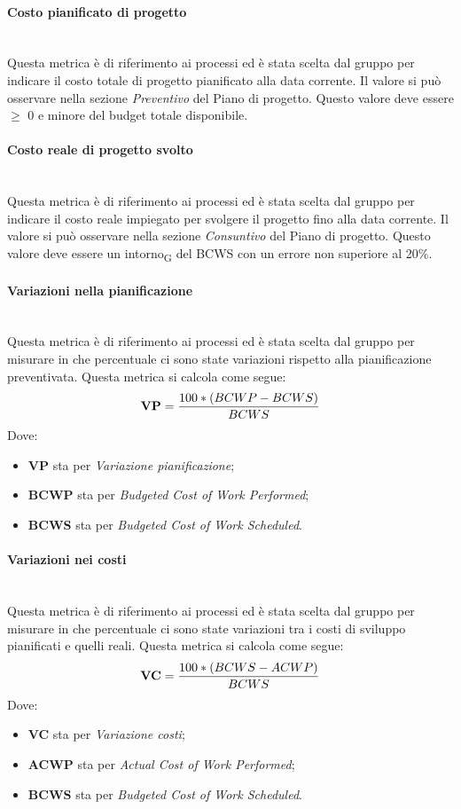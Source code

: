 \paragraph{Costo pianificato di progetto}\mbox{}\\
Questa metrica è di riferimento ai processi ed è stata scelta dal gruppo per indicare il costo totale di progetto pianificato alla data corrente. Il valore si può osservare nella sezione \textit{Preventivo} del Piano di progetto. Questo valore deve essere $\geq$ 0 e minore del budget totale disponibile.
\paragraph{Costo reale di progetto svolto}\mbox{}\\
Questa metrica è di riferimento ai processi ed è stata scelta dal gruppo per indicare il costo reale impiegato per svolgere il progetto fino alla data corrente. Il valore si può osservare nella sezione \textit{Consuntivo} del Piano di progetto. Questo valore deve essere un intorno\textsubscript{G} del BCWS con un errore non superiore al 20\%.
\paragraph{Variazioni nella pianificazione}\mbox{}\\
Questa metrica è di riferimento ai processi ed è stata scelta dal gruppo per misurare in che percentuale ci sono state variazioni rispetto alla pianificazione preventivata. Questa metrica si calcola come segue:
\begin{align*}
	\centering
	\textbf{VP} = \frac{100 * (BCWP - BCWS)}{BCWS}
\end{align*}
Dove:
\begin{itemize}
	\item \textbf{VP} sta per \textit{Variazione pianificazione};
	\item \textbf{BCWP} sta per \textit{Budgeted Cost of Work Performed};
	\item \textbf{BCWS} sta per \textit{Budgeted Cost of Work Scheduled}.
\end{itemize}
\paragraph{Variazioni nei costi}\mbox{}\\
Questa metrica è di riferimento ai processi ed è stata scelta dal gruppo per misurare in che percentuale ci sono state variazioni tra i costi di sviluppo pianificati e quelli reali. Questa metrica si calcola come segue:
\begin{align*}
	\centering
	\textbf{VC} = \frac{100 * (BCWS - ACWP)}{BCWS}
\end{align*}
Dove:
\begin{itemize}
	\item \textbf{VC} sta per \textit{Variazione costi};
	\item \textbf{ACWP} sta per \textit{Actual Cost of Work Performed};
	\item \textbf{BCWS} sta per \textit{Budgeted Cost of Work Scheduled}.
\end{itemize}

